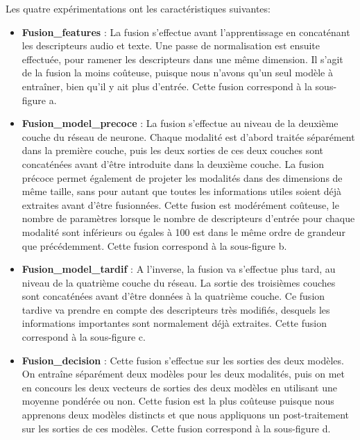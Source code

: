 Les quatre expérimentations ont les caractéristiques suivantes:
\begin{itemize}
  \item \textbf{Fusion\_features} : La fusion s'effectue avant l'apprentissage en concaténant les descripteurs audio et texte. Une passe de normalisation est ensuite effectuée, pour ramener les descripteurs dans une même dimension. Il s'agit de la fusion la moins coûteuse, puisque nous n'avons qu'un seul modèle à entraîner, bien qu'il y ait plus d'entrée. Cette fusion correspond à la sous-figure a.
  \item \textbf{Fusion\_model\_precoce} : La fusion s'effectue  au niveau de la deuxième couche du réseau de neurone. Chaque modalité est d'abord traitée séparément dans la première couche, puis les deux sorties de ces deux couches sont concaténées avant d'être introduite dans la deuxième couche. La fusion précoce permet également de projeter les modalités dans des dimensions de même taille, sans pour autant que toutes les informations utiles soient déjà extraites avant d'être fusionnées. Cette fusion est modérément coûteuse, le nombre de paramètres lorsque le nombre de descripteurs d'entrée pour chaque modalité sont inférieurs ou égales à 100 est dans le même ordre de grandeur que précédemment. Cette fusion correspond à la sous-figure b.
  \item \textbf{Fusion\_model\_tardif} : A l'inverse, la fusion va s'effectue plus tard, au niveau de la quatrième couche du réseau. La sortie des troisièmes couches sont concaténées avant d'être données à la quatrième couche. Ce fusion tardive va prendre en compte des descripteurs très modifiés, desquels les informations importantes sont normalement déjà extraites. Cette fusion correspond à la sous-figure c.
  \item \textbf{Fusion\_decision} : Cette fusion s'effectue sur les sorties des deux modèles. On entraîne séparément deux modèles pour les deux modalités, puis on met en concours les deux vecteurs de sorties des deux modèles en utilisant une moyenne pondérée ou non. Cette fusion est la plus coûteuse puisque nous apprenons deux modèles distincts et que nous appliquons un post-traitement sur les sorties de ces modèles. Cette fusion correspond à la sous-figure d.
\end{itemize}

